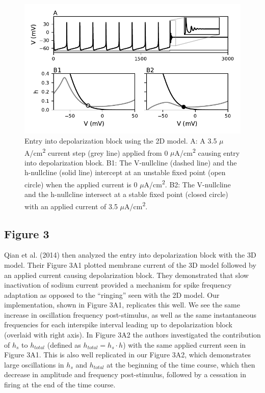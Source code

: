 \begin{figure}
	\centering
	\includegraphics[scale=0.7]{../figures/figure_2.pdf}
	\caption{Entry into depolarization block using the 2D model. A: A 3.5 $\mu$A/cm\textsuperscript{2} current step (grey line) applied from 0 $\mu$A/cm\textsuperscript{2} causing entry into depolarization block. B1: The V-nullcline (dashed line) and the h-nullcline (solid line) intercept at an unstable fixed point (open circle) when the applied current is 0 $\mu$A/cm\textsuperscript{2}. B2: The V-nullcline and the h-nullcline intersect at a stable fixed point (closed circle) with an applied current of 3.5 $\mu$A/cm\textsuperscript{2}.}
	\label{fig:2}
\end{figure}

\subsection{Figure 3}
Qian et al. (2014) then analyzed the entry into depolarization block with the 3D model. Their Figure 3A1 plotted membrane current of the 3D model followed by an applied current causing depolarization block. They demonstrated that slow inactivation of sodium current provided a mechanism for spike frequency adaptation as opposed to the ``ringing'' seen with the 2D model. Our implementation, shown in Figure 3A1, replicates this well. We see the same increase in oscillation frequency post-stimulus, as well as the same instantaneous frequencies for each interspike interval leading up to depolarization block (overlaid with right axis). In Figure 3A2 the authors investigated the contribution of $h_s$ to $h_{total}$ (defined as $h_{total}= h_{s}\cdot h$) with the same applied current seen in Figure 3A1. This is also well replicated in our Figure 3A2, which demonstrates large oscillations in $h_s$ and $h_{total}$ at the beginning of the time course, which then decrease in amplitude and frequency post-stimulus, followed by a cessation in firing at the end of the time course.

